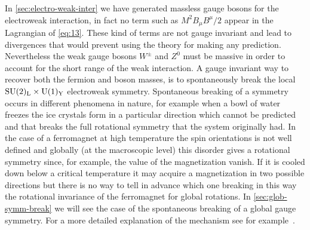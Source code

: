 In \cref{sec:electro-weak-inter} we have generated massless gauge bosons for the
electroweak interaction, in fact no term such as $M^{2} B_{\mu}B^{\mu} / 2$
appear in the Lagrangian of \cref{eq:13}. These kind of terms are not gauge
invariant and lead to divergences that would prevent using the theory for making
any prediction. Nevertheless the weak gauge bosons $W^\pm$ and $Z^0$ must be
massive in order to account for the short range of the weak interaction. A gauge
invariant way to recover both the fermion and boson masses, is to spontaneously
break the local $\mathrm{SU}(2)_\mathrm{L} \times \mathrm{U}(1)_\mathrm{Y}$ electroweak symmetry. Spontaneous
breaking of a symmetry occurs in different phenomena in nature, for example when
a bowl of water freezes the ice crystals form in a particular direction which
cannot be predicted and that breaks the full rotational symmetry that the system
originally had. In the case of a ferromagnet at high temperature the spin
orientations is not well defined and globally (at the macroscopic level) this
disorder gives a rotational symmetry since, for example, the value of the
magnetization vanish. If it is cooled down below a critical temperature it may
acquire a magnetization in two possible directions but there is no way to tell
in advance which one breaking in this way the rotational invariance of the
ferromagnet for global rotations. In \cref{sec:glob-symm-break} we will see the
case of the spontaneous breaking of a global gauge symmetry. For a more detailed
explanation of the mechanism see for example~\cite{martin:particle}.
